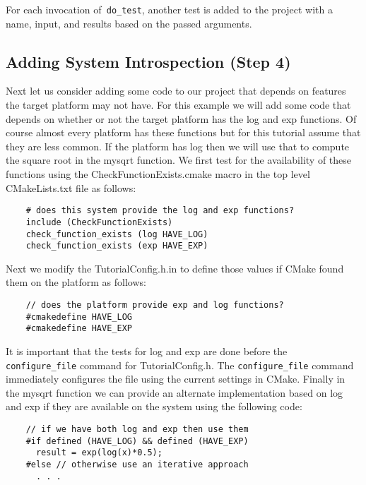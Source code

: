 \documentclass[UTF8,a4paper,8pt]{ctexart}
\begin{document}
	For each invocation of\verb| do_test|, another test is added to the project with a name, input, and results based on the passed arguments.
	
	
\subsection{Adding System Introspection (Step 4)}
	Next let us consider adding some code to our project that depends on features the target platform may not have. For this example we will add some code that depends on whether or not the target platform has the log and exp functions. Of course almost every platform has these functions but for this tutorial assume that they are less common. If the platform has log then we will use that to compute the square root in the mysqrt function. We first test for the availability of these functions using the CheckFunctionExists.cmake macro in the top level CMakeLists.txt file as follows:
	\begin{lstlisting}
	# does this system provide the log and exp functions?
	include (CheckFunctionExists)
	check_function_exists (log HAVE_LOG)
	check_function_exists (exp HAVE_EXP)	
	\end{lstlisting}

	Next we modify the TutorialConfig.h.in to define those values if CMake found them on the platform as follows:
	\begin{lstlisting}
	// does the platform provide exp and log functions?
	#cmakedefine HAVE_LOG
	#cmakedefine HAVE_EXP	
	\end{lstlisting}	

	It is important that the tests for log and exp are done before the\verb| configure_file| command for TutorialConfig.h. The \verb|configure_file| command immediately configures the file using the current settings in CMake. Finally in the mysqrt function we can provide an alternate implementation based on log and exp if they are available on the system using the following code:
	\begin{lstlisting}
	// if we have both log and exp then use them
	#if defined (HAVE_LOG) && defined (HAVE_EXP)
	  result = exp(log(x)*0.5);
	#else // otherwise use an iterative approach
	  . . .	
	\end{lstlisting}	
\end{document}
